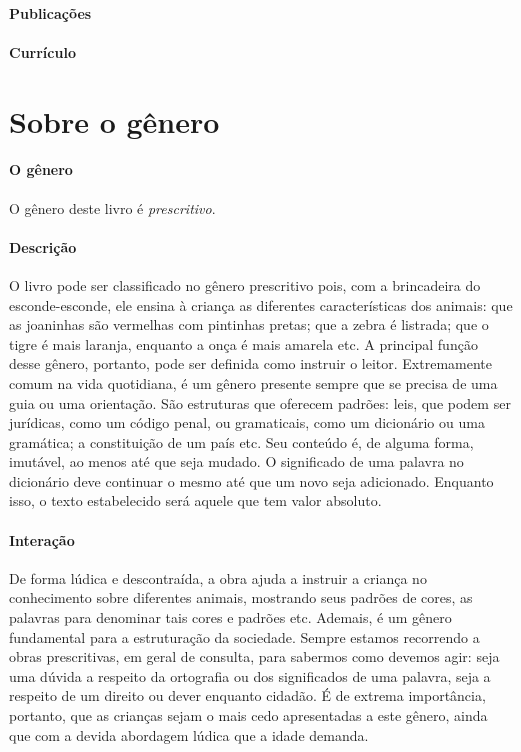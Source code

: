 \documentclass[11pt]{extarticle}
\begin{document}

\paragraph{Publicações}

\paragraph{Currículo} 


\section{Sobre o gênero}

\paragraph{O gênero} O gênero deste livro é \textit{prescritivo}. 


\paragraph{Descrição} O livro pode ser classificado no gênero prescritivo pois, com a brincadeira do esconde-esconde, ele ensina à criança as diferentes características dos animais: que as joaninhas são vermelhas com pintinhas pretas; que a zebra é listrada; que o tigre é mais laranja, enquanto a onça é mais amarela etc. A principal função desse gênero, portanto, pode ser definida como instruir o leitor.
Extremamente comum na vida quotidiana, é um gênero presente
sempre que se precisa de uma guia ou uma orientação. São estruturas 
que oferecem padrões: leis, que podem ser jurídicas, como um código
penal, ou gramaticais, como um dicionário ou uma gramática; a constituição
de um país etc. Seu conteúdo é, de alguma forma, imutável, ao menos até que seja
mudado. O significado de uma palavra no dicionário deve continuar o mesmo
até que um novo seja adicionado. Enquanto isso, o texto
estabelecido será aquele que tem valor absoluto.

\paragraph{Interação} De forma lúdica e descontraída, a obra ajuda a instruir a criança no conhecimento sobre diferentes animais, mostrando seus padrões de cores, as palavras para denominar tais cores e padrões etc. Ademais, é um gênero fundamental para a estruturação da sociedade.
Sempre estamos recorrendo a obras prescritivas, em geral de consulta, para
sabermos como devemos agir: seja uma dúvida a respeito da ortografia ou 
dos significados de uma palavra, seja a respeito de um direito ou dever
enquanto cidadão. É de extrema importância, portanto, que as crianças
sejam o mais cedo apresentadas a este gênero, ainda que com a 
devida abordagem lúdica que a idade demanda.
\end{document}
